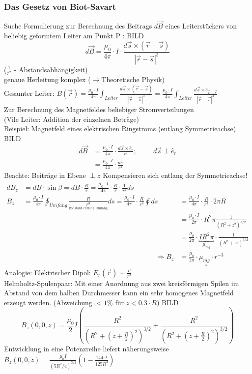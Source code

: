 \subsubsection{Das Gesetz von Biot-Savart}
Suche Formulierung zur Berechnung des Beitrags $ d\vec{B} $ eines Leiterstückers von beliebig geformtem Leiter am Punkt P :
BILD
$$ \boxed{d\vec{B} = \frac{\mu_0}{4\pi} \cdot I \cdot \frac{d\vec{s} \times (\vec{r}-\vec{s})}{|\vec{r}-\vec{s}|^3} } $$
($ \frac{1}{r^2} $ - Abstandsabhängigkeit)\\
genaue Herleitung komplex ($ \rightarrow $Theoretische Physik)\\
Gesamter Leiter: $ B(\vec{r}) = \frac{\mu_0 \cdot I}{4\pi} {\displaystyle\int_{Leiter}} \frac{d\vec{s} \times (\vec{r}-\vec{s})}{|\vec{r}-\vec{s}|^3} = \frac{\mu_0 \cdot I}{4\pi} {\displaystyle\int_{Leiter}} \frac{d\vec{s} \times \hat{e}_{\vec{r}-\vec{s}}}{|\vec{r}-\vec{s}|^2} $ \\
Zur Berechnung des Magnetfeldes beliebiger Stromverteilungen\\
(Vile Leiter: Addition der einzelnen Beträge)\\ \break
Beispiel: Magnetfeld eines elektrischen Ringstroms (entlang Symmetrieachse)
BILD
\begin{align*}
	d\vec{B} &= \frac{\mu_0 \cdot I}{4\pi} \cdot \frac{d\vec{s} \times \hat{e}_r}{r^2} ;\hspace{1cm} d\vec{s} \perp \hat{e}_r\\
	&=\frac{\mu_0 \cdot I}{4\pi} \cdot \frac{ds}{r^2}
\end{align*}
Beachte: Beiträge in Ebene $ \perp z$ Kompensieren sich entlang der Symmetrieachse!
\begin{align*}
 dB_z &= dB\cdot \sin\beta = dB \cdot \frac{R}{r} = \frac{\mu_0 \cdot I}{4\pi} \cdot \frac{R}{r} \cdot \frac{1}{r^2} ds\\
 B_z &= \frac{\mu_0 \cdot I}{4\pi} {\displaystyle\oint_{Umfang}} \frac{R}{\underset{\text{konstant entlang Umfang}}{r^3}} ds = \frac{\mu_0 \cdot I}{4\pi} \cdot \frac{R}{r^3} {\displaystyle\oint}ds &&= \frac{\mu_0 \cdot I}{4\pi} \cdot \frac{R}{r^3} \cdot 2\pi R\\
 & &&=\frac{\mu_0 \cdot I}{2\pi} \cdot R^2\pi\frac{1}{(R^2+z^2)^{3/2}}\\
 & &&= \frac{\mu_0}{2\pi} \cdot \underbracket{\boxed{IR^2\pi}}_{\mu_{mg}} \cdot \frac{1}{(R^2+z^2)^{3/2}}\\
  && \Rightarrow B_z &=\underline{\underline{ \frac{\mu_0}{2\pi} \cdot \mu_{mg} \cdot r^{-3}}}
\end{align*}
Analogie: Elektrischer Dipol: $ E_r(\vec{r}) \sim \frac{\rho}{r^3} $\\
Helmholtz-Spulenpaar:
Mit einer Anordnung aus zwei kreisförmigen Spilen im Abstand von dem halben Durchmesser kann ein sehr homogenes Magnetfeld erzeugt werden. (Abweichung $ <1\% $ für $ z<0.3\cdot R $) BILD
$$ B_z (0,0,z) = \frac{\mu_0}{2}I\left( \frac{R^2}{(R^2+(z+\frac{R}{2})^2 )^{3/2} }+\frac{R^2}{(R^2+(z+\frac{R}{2})^2 )^{3/2} }\right)  $$
Entwicklung in eine Potenzreihe liefert näherungsweise $  B_z (0,0,z) = \frac{\mu_0 I}{(5R^2/4)^{3/2}}\left( 1-\frac{144z^4}{125R^4} \right)  $